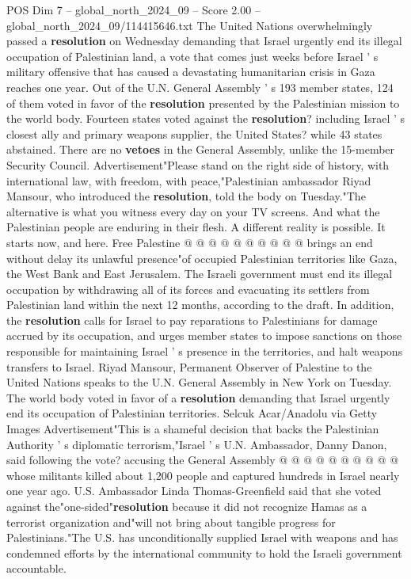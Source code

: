 \begin{textsample}{POS Dim 7 – global\_north\_2024\_09 – Score 2.00 – global\_north\_2024\_09/114415646.txt}  \label{ex:f7_pos_434}
The United Nations overwhelmingly passed a \textbf{resolution} on Wednesday demanding that Israel urgently end its illegal occupation of Palestinian land, a vote that comes just weeks before Israel ' s military offensive that has caused a devastating humanitarian crisis in Gaza reaches one year.
Out of the U.N.
General Assembly ' s 193 member states, 124 of them voted in favor of the \textbf{resolution} presented by the Palestinian mission to the world body.
Fourteen states voted against the \textbf{resolution}? including Israel ' s closest ally and primary weapons supplier, the United States? while 43 states abstained.
There are no \textbf{vetoes} in the General Assembly, unlike the 15-member Security Council.
Advertisement"Please stand on the right side of history, with international law, with freedom, with peace,"Palestinian ambassador Riyad Mansour, who introduced the \textbf{resolution}, told the body on Tuesday."The alternative is what you witness every day on your TV screens.
And what the Palestinian people are enduring in their flesh.
A different reality is possible.
It starts now, and here.
Free Palestine @ @ @ @ @ @ @ @ @ @ brings an end without delay its unlawful presence"of occupied Palestinian territories like Gaza, the West Bank and East Jerusalem.
The Israeli government must end its illegal occupation by withdrawing all of its forces and evacuating its settlers from Palestinian land within the next 12 months, according to the draft.
In addition, the \textbf{resolution} calls for Israel to pay reparations to Palestinians for damage accrued by its occupation, and urges member states to impose sanctions on those responsible for maintaining Israel ' s presence in the territories, and halt weapons transfers to Israel.
Riyad Mansour, Permanent Observer of Palestine to the United Nations speaks to the U.N.
General Assembly in New York on Tuesday.
The world body voted in favor of a \textbf{resolution} demanding that Israel urgently end its occupation of Palestinian territories.
Selcuk Acar/Anadolu via Getty Images Advertisement"This is a shameful decision that backs the Palestinian Authority ' s diplomatic terrorism,"Israel ' s U.N.
Ambassador, Danny Danon, said following the vote? accusing the General Assembly @ @ @ @ @ @ @ @ @ @ whose militants killed about 1,200 people and captured hundreds in Israel nearly one year ago.
U.S.
Ambassador Linda Thomas-Greenfield said that she voted against the"one-sided"\textbf{resolution} because it did not recognize Hamas as a terrorist organization and"will not bring about tangible progress for Palestinians."The U.S. has unconditionally supplied Israel with weapons and has condemned efforts by the international community to hold the Israeli government accountable.

\end{textsample}
